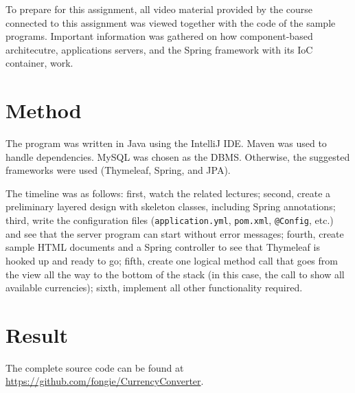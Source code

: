 \documentclass[a4paper]{scrartcl}
\def\code#1{\texttt{#1}}
\begin{document}
To prepare for this assignment, all video material provided by the course connected to this assignment was viewed together with the code of the sample programs. Important information was gathered on how component-based architecutre, applications servers, and the Spring framework with its IoC container, work.

\section{Method}

\noindent The program was written in Java using the IntelliJ IDE. Maven was used to handle dependencies. MySQL was chosen as the DBMS. Otherwise, the suggested frameworks were used (Thymeleaf, Spring, and JPA).

The timeline was as follows: first, watch the related lectures; second, create a preliminary layered design with skeleton classes, including Spring annotations; third, write the configuration files (\code{application.yml}, \code{pom.xml}, \code{@Config}, etc.) and see that the server program can start without error messages; fourth, create sample HTML documents and a Spring controller to see that Thymeleaf is hooked up and ready to go; fifth, create one logical method call that goes from the view all the way to the bottom of the stack (in this case, the call to show all available currencies); sixth, implement all other functionality required. 

\section{Result}

\noindent The complete source code can be found at \href{https://github.com/fongie/CurrencyConverter}{https://github.com/fongie/CurrencyConverter}.
\end{document}
